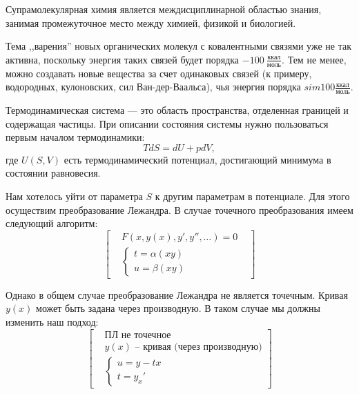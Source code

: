 
\begin{lecture}
	Супрамолекулярная химия является междисциплинарной областью знания, занимая промежуточное место между химией, физикой и биологией.
		
	Тема ,,варения'' новых органических молекул с ковалентными связями уже не так активна, поскольку энергия таких связей будет порядка $-100~\frac{\text{ккал}}{\text{моль}}$.
    Тем не менее, можно создавать новые вещества за счет одинаковых связей (к примеру, водородных, кулоновских, сил Ван-дер-Ваальса), чья энергия порядка
    $ sim 100 \frac{\text{ккал}}{моль}$.
    
    Термодинамическая система --- это область пространства, отделенная границей и содержащая частицы.
    При описании состояния системы нужно пользоваться первым началом термодинамики:
    \begin{equation}
    	T dS = dU + p dV,
    	\label{eq:first_statement_therm}
    \end{equation}
    где $U (S, V)$ есть термодинамический потенциал, достигающий минимума в состоянии равновесия.
    
    Нам хотелось уйти от параметра $S$ к другим параметрам в потенциале. Для этого осуществим преобразование Лежандра. В случае точечного преобразования имеем следующий алгоритм:
    \begin{equation}
    	\begin{bmatrix}
			&F( x, y(x), y', y'', \dots ) = 0 & \\
			&\begin{cases}
				t = \alpha (xy) \\
				u = \beta (xy)
			\end{cases}
		\end{bmatrix}
		\label{eq:dot_lejandr}
    \end{equation}
    
    Однако в общем случае преобразование Лежандра не является точечным. Кривая $ y(x) $ может быть задана через производную. В таком случае мы должны изменить наш подход:
    \begin{equation}
    	\begin{bmatrix}
    		&\text{ПЛ не точечное} \\
    		&y(x) \text{ -- кривая (через производную)} \\
    		&\begin{cases}
    			u = y - tx \\
    			t = y_x'
    		\end{cases}
    	\end{bmatrix}
    \end{equation}
    

\end{lecture}
